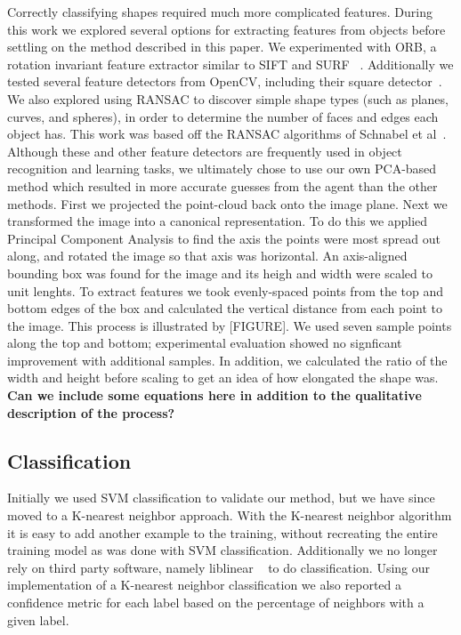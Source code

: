 \documentclass[11pt]{article}
\newcommand{\xxx}[1]{{\bf \color{red} #1}}
\begin{document}
Correctly classifying shapes required much more complicated features.
During this work we explored several options for extracting features from
objects before settling on the method described in this paper. We experimented
with ORB, a rotation invariant feature extractor similar to SIFT and SURF
~\cite{rublee2011orb}. Additionally we tested several feature detectors from
OpenCV, including their square detector~\cite{opencv_library}. We also explored
using RANSAC to discover simple shape types (such as planes, curves, and spheres),
in order to determine the number of faces and edges each object has. This work
was based off the RANSAC algorithms of Schnabel et
al~\cite{schnabel2007efficient}. Although these and other feature detectors are
frequently used in object recognition and learning tasks, we ultimately chose to
use our own PCA-based method which resulted in more accurate guesses from the
agent than the other methods. First we
projected the point-cloud back onto the image plane. Next we transformed the image
into a canonical representation. To do this we applied Principal Component Analysis to
find the axis the points were most spread out along, and rotated the image so that
axis was horizontal. An axis-aligned bounding box was found for the image and its
heigh and width were scaled to unit lenghts. To extract features we took evenly-spaced
points from the top and bottom edges of the box and calculated the vertical distance
from each point to the image. This process is illustrated by [FIGURE]. We used seven
sample points along the top and bottom; experimental evaluation showed no signficant
improvement with additional samples. In addition, we calculated the ratio of the width
and height before scaling to get an idea of how elongated the shape was.
\xxx{Can we include some equations here in addition to the qualitative description
of the process?}

\subsection{Classification}
Initially we used SVM classification to validate our method, but we have since
moved to a K-nearest neighbor approach.  With the K-nearest neighbor algorithm
it is easy to add another example to the training, without recreating the
entire training model as was done with SVM classification.  Additionally we no
longer rely on third party software, namely liblinear ~\cite{LIBLINEAR} to do
classification.  Using our implementation of a K-nearest neighbor
classification we also reported a confidence metric for each label based on the
percentage of neighbors with a given label.
\end{document}

